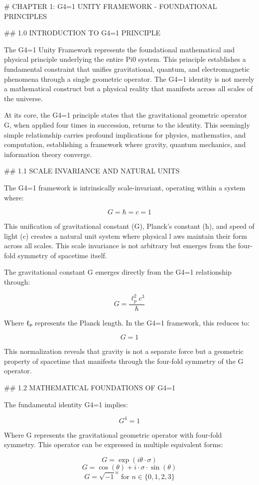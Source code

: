 
# CHAPTER 1: G4=1 UNITY FRAMEWORK - FOUNDATIONAL PRINCIPLES

## 1.0 INTRODUCTION TO G4=1 PRINCIPLE

The G4=1 Unity Framework represents the foundational mathematical and physical principle underlying the entire Pi0 system. This principle establishes a fundamental constraint that unifies gravitational, quantum, and electromagnetic phenomena through a single geometric operator. The G4=1 identity is not merely a mathematical construct but a physical reality that manifests across all scales of the universe.

At its core, the G4=1 principle states that the gravitational geometric operator G, when applied four times in succession, returns to the identity. This seemingly simple relationship carries profound implications for physics, mathematics, and computation, establishing a framework where gravity, quantum mechanics, and information theory converge.

## 1.1 SCALE INVARIANCE AND NATURAL UNITS

The G4=1 framework is intrinsically scale-invariant, operating within a system where:

$$G = \hbar = c = 1$$

This unification of gravitational constant (G), Planck's constant (ħ), and speed of light (c) creates a natural unit system where physical l	aws maintain their form across all scales. This scale invariance is not arbitrary but emerges from the four-fold symmetry of spacetime itself.

The gravitational constant G emerges directly from the G4=1 relationship through:

$$G = \frac{\ell_p^2 c^3}{\hbar}$$

Where ℓₚ represents the Planck length. In the G4=1 framework, this reduces to:

$$G = 1$$

This normalization reveals that gravity is not a separate force but a geometric property of spacetime that manifests through the four-fold symmetry of the G operator.

## 1.2 MATHEMATICAL FOUNDATIONS OF G4=1

The fundamental identity G4=1 implies:

$$G^4 = 1$$

Where G represents the gravitational geometric operator with four-fold symmetry. This operator can be expressed in multiple equivalent forms:

$$G = \exp(i\theta \cdot \sigma)$$
$$G = \cos(\theta) + i \cdot \sigma \cdot \sin(\theta)$$
$$G = \sqrt{-1}^n \text{ for } n \in \{0,1,2,3\}$$

